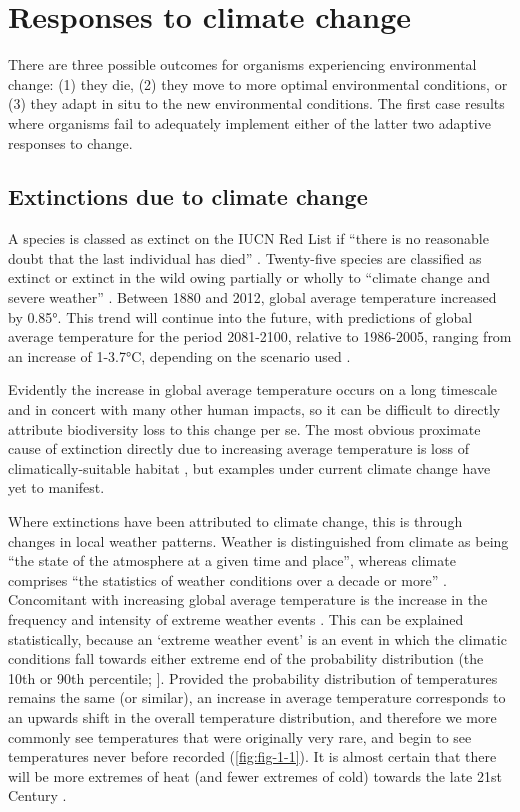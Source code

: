 \documentclass[12pt,a4paper,]{report}
\theoremstyle{definition}
\theoremstyle{definition}
\theoremstyle{definition}
\theoremstyle{remark}
\begin{document}
\section{Responses to climate change}\label{responses-to-climate-change}

There are three possible outcomes for organisms experiencing
environmental change: (1) they die, (2) they move to more optimal
environmental conditions, or (3) they adapt in situ to the new
environmental conditions. The first case results where organisms fail to
adequately implement either of the latter two adaptive responses to
change.

\subsection{Extinctions due to climate
change}\label{extinctions-due-to-climate-change}

A species is classed as extinct on the IUCN Red List if ``there is no
reasonable doubt that the last individual has died''
\citep{baillie2004}. Twenty-five species are classified as extinct or
extinct in the wild owing partially or wholly to ``climate change and
severe weather'' \citep{iucn_iucn2014}. Between 1880 and 2012, global
average temperature increased by 0.85°. This trend will continue into
the future, with predictions of global average temperature for the
period 2081-2100, relative to 1986-2005, ranging from an increase of
1-3.7°C, depending on the scenario used \citep{ipcc2013}.

Evidently the increase in global average temperature occurs on a long
timescale and in concert with many other human impacts, so it can be
difficult to directly attribute biodiversity loss to this change per se.
The most obvious proximate cause of extinction directly due to
increasing average temperature is loss of climatically-suitable habitat
\citep{thomas_extinction2004}, but examples under current climate change
have yet to manifest.

Where extinctions have been attributed to climate change, this is
through changes in local weather patterns. Weather is distinguished from
climate as being ``the state of the atmosphere at a given time and
place'', whereas climate comprises ``the statistics of weather
conditions over a decade or more'' \citep{ipcc2013}. Concomitant with
increasing global average temperature is the increase in the frequency
and intensity of extreme weather events \citep{ipcc2013}. This can be
explained statistically, because an `extreme weather event' is an event
in which the climatic conditions fall towards either extreme end of the
probability distribution (the 10th or 90th percentile;
\citet{ipcc2013}{]}. Provided the probability distribution of
temperatures remains the same (or similar), an increase in average
temperature corresponds to an upwards shift in the overall temperature
distribution, and therefore we more commonly see temperatures that were
originally very rare, and begin to see temperatures never before
recorded (\autoref{fig:fig-1-1}). It is almost certain that there will
be more extremes of heat (and fewer extremes of cold) towards the late
21st Century \citep{ipcc2013}.
\end{document}
